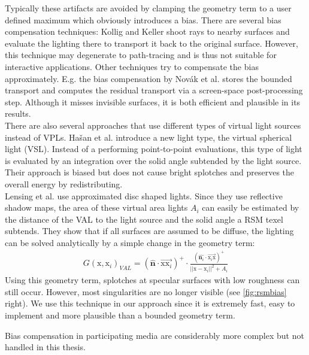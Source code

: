\documentclass[thesis.tex]{subfiles}
\begin{document}
Typically these artifacts are avoided by clamping the geometry term to a user defined maximum which obviously introduces a bias.
There are several bias compensation techniques:
Kollig and Keller \cite{bib:biascomp:kk04} shoot rays to nearby surfaces and evaluate the lighting there to transport it back to the original surface.
However, this technique may degenerate to path-tracing and is thus not suitable for interactive applications.
Other techniques try to compensate the bias approximately.
E.g. the bias compensation by Nov\'{a}k et al. \cite{bib:biascomp:novak11} stores the bounded transport and computes the residual transport via a screen-space post-processing step.
Although it misses invisible surfaces, it is both efficient and plausible in its results.
\\
There are also several approaches that use different types of virtual light sources instead of VPLs.
Ha{\v{s}}an et al. \cite{bib:biascomp:vsl} introduce a new light type, the virtual spherical light (VSL).
Instead of a performing point-to-point evaluations, this type of light is evaluated by an integration over the solid angle subtended by the light source.
Their approach is biased but does not cause bright splotches and preserves the overall energy by redistributing.
\\
Lensing et al. \cite{bib:LightskinPaper} use approximated disc shaped lights.
Since they use reflective shadow maps, the area of these virtual area lights $A_{i}$ can easily be estimated by the distance of the VAL to the light source and the solid angle a RSM texel subtends.
They show that if all surfaces are assumed to be diffuse, the lighting can be solved analytically by a simple change in the geometry term:
\begin{align}
G(\mathrm{x}, \mathrm{x}_i)_{VAL} = (\hat{\mathbf{n}} \cdot \overrightarrow{\mathrm{x}\mathrm{x}_i})^+ \cdot \frac{(\hat{\mathbf{n}_i} \cdot \overrightarrow{\mathrm{x}_i\mathrm{x}} )^+}{||\mathrm{x} - \mathrm{x}_i||^2 + A_{i}}
\end{align}
Using this geometry term, splotches at specular surfaces with low roughness can still occur.
However, most singularities are no longer visible (see \autoref{fig:rsmbias} right).
We use this technique in our approach since it is extremely fast, easy to implement and more plausible than a bounded geometry term.

Bias compensation in participating media are considerably more complex but not handled in this thesis.
\end{document}
